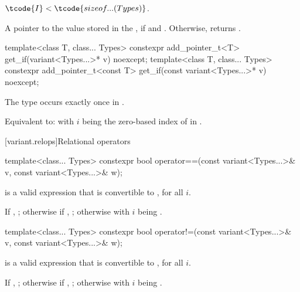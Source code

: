 \begin{itemdescr}
\pnum
\mandates
$\tcode{I} < \tcode{sizeof...(Types)}$.

\pnum
\returns
A pointer to the value stored in the , if 
and . Otherwise, returns .
\end{itemdescr}

%
%
\begin{itemdecl}
template<class T, class... Types>
  constexpr add_pointer_t<T>
    get_if(variant<Types...>* v) noexcept;
template<class T, class... Types>
  constexpr add_pointer_t<const T>
    get_if(const variant<Types...>* v) noexcept;
\end{itemdecl}

\begin{itemdescr}
\pnum
\mandates
The type  occurs exactly once in .

\pnum
\effects
Equivalent to:  with $i$ being the zero-based
index of  in .
\end{itemdescr}

[variant.relops]{Relational operators}

%
\begin{itemdecl}
template<class... Types>
  constexpr bool operator==(const variant<Types...>& v, const variant<Types...>& w);
\end{itemdecl}

\begin{itemdescr}
\pnum
\mandates
{} is a valid expression that is
convertible to , for all $i$.

\pnum
\returns
If , ;
otherwise if , ;
otherwise  with $i$ being .
\end{itemdescr}

%
\begin{itemdecl}
template<class... Types>
  constexpr bool operator!=(const variant<Types...>& v, const variant<Types...>& w);
\end{itemdecl}

\begin{itemdescr}
\pnum
\mandates
{} is a valid expression that is
convertible to , for all $i$.

\pnum
\returns
If , ;
otherwise if , ;
otherwise  with $i$ being .
\end{itemdescr}

